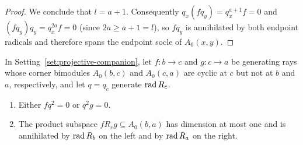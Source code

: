 \begin{proof}
We conclude that $l=a+1$. Consequently $q_x(fq_y)=q_x^{a+1}f=0$ and $(fq_y)q_y=q_x^{2a}f=0$ (since $2a\geq a+1=l$), so $fq_y$ is annihilated by both endpoint radicals and therefore spans the endpoint socle of $A_0(x,y)$.
\end{proof}

\begin{lemma}
\label{lem:opposite-controls}
In Setting~\ref{set:projective-companion}, let $f\colon b\to c$ and $g\colon c\to a$ be generating rays whose corner bimodules $A_0(b,c)$ and $A_0(c,a)$ are cyclic at $c$ but not at $b$ and $a$, respectively, and let $q=q_c$ generate $\operatorname{rad} R_c$.
\begin{enumerate}[label={\upshape(\arabic*)}]
\item Either $fq^2=0$ or $q^2g=0$.
\item The product subspace $fR_cg\subseteq A_0(b,a)$ has dimension at most one and is annihilated by $\operatorname{rad} R_b$ on the left and by $\operatorname{rad} R_a$ on the right.
\end{enumerate}
\end{lemma}
